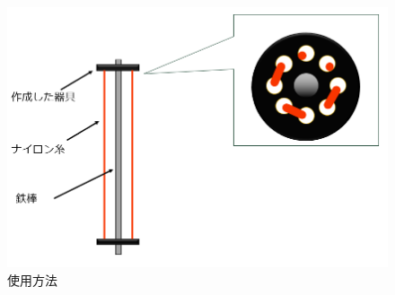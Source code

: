 \begin{figure}[h]
  \centering  %
  \includegraphics[scale=0.5]{pic/tukau2.PNG}
  \caption{使用方法}
  \label{fig:13}
\end{figure}

